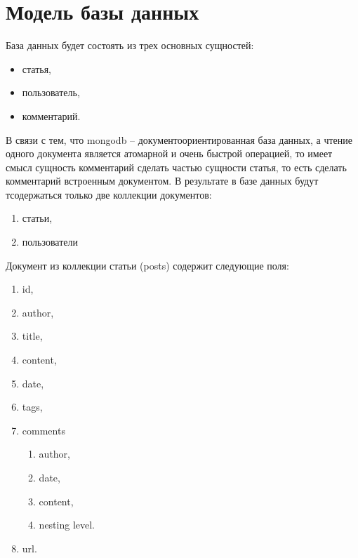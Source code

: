 \documentclass[a4paper]{article}
\begin{document}
\section{Модель базы данных}
База данных будет состоять из трех основных сущностей:
\begin{itemize}[noitemsep]
  \item статья,
  \item пользователь,
  \item комментарий.
\end{itemize}
В связи с тем, что mongodb -- документоориентированная база данных, а чтение одного документа является атомарной и очень быстрой операцией, то имеет смысл сущность комментарий сделать частью сущности статья, то есть сделать комментарий встроенным документом. В результате в базе данных будут тсодержаться только две коллекции документов:
\begin{enumerate}[noitemsep]
  \item статьи,
  \item пользователи
\end{enumerate}
Документ из коллекции статьи (posts)  содержит следующие поля:
\begin{enumerate}[noitemsep]
  \item id,
  \item author,
  \item title,
  \item content,
  \item date,
  \item tags,
  \item comments
    \begin{enumerate}
      \item author,
      \item date,
      \item content,
      \item nesting level.
    \end{enumerate}
  \item url.
\end{enumerate}
\end{document}
